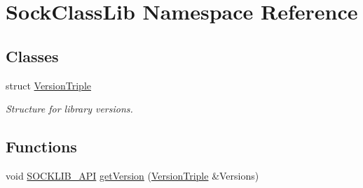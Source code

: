 \hypertarget{namespaceSockClassLib}{}\section{Sock\+Class\+Lib Namespace Reference}
\label{namespaceSockClassLib}
\subsection*{Classes}
\begin{DoxyCompactItemize}
\item 
struct \hyperlink{structSockClassLib_1_1VersionTriple}{Version\+Triple}
\begin{DoxyCompactList}\small\item\em Structure for library versions. \end{DoxyCompactList}\end{DoxyCompactItemize}
\subsection*{Functions}
\begin{DoxyCompactItemize}
\item 
void \hyperlink{sockclasslib_8h_a9cc1058a4314729e5966c036881bed34}{S\+O\+C\+K\+L\+I\+B\+\_\+\+A\+PI} \hyperlink{group__LIB__GROUP_ga618a999613777f55f50f3e9b3253b6e7}{get\+Version} (\hyperlink{structSockClassLib_1_1VersionTriple}{Version\+Triple} \&Versions)
\end{DoxyCompactItemize}
